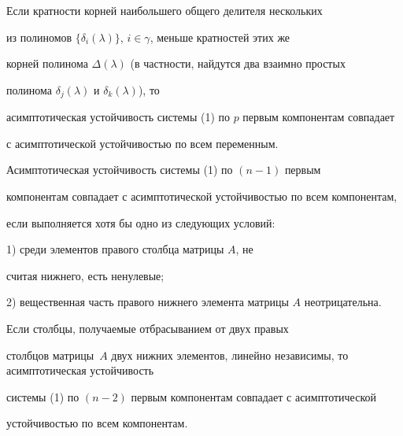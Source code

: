  


\begin{cor} 


Если кратности корней наибольшего общего делителя нескольких 


из полиномов $\{\delta_i(\lambda)\}$, $i\in\gamma$, меньше кратностей этих же 


корней полинома $\Delta(\lambda)$ (в частности, найдутся два взаимно простых 


полинома $\delta_j(\lambda)$ и $\delta_k(\lambda)$), то 


асимптотическая устойчивость системы (1) по $p$ первым компонентам совпадает 


с асимптотической устойчивостью по всем переменным. 


\end{cor} 


 


\begin{cor} 


Асимптотическая устойчивость системы (1) по $(n-1)$ первым 


компонентам совпадает с асимптотической устойчивостью по всем компонентам, 


если выполняется хотя бы одно из следующих условий:


 


1) среди элементов правого столбца матрицы $A$, не 


считая нижнего, есть ненулевые; 


 


2) вещественная часть правого нижнего элемента матрицы $A$ неотрицательна. 


\end{cor} 


 


\begin{cor} 


Если столбцы, получаемые отбрасыванием от двух правых 


столбцов матрицы~$A$ двух нижних элементов, линейно независимы, то асимптотическая устойчивость 


системы (1) по $(n-2)$ первым компонентам совпадает с асимптотической 


устойчивостью по всем компонентам. 


\end{cor} 


